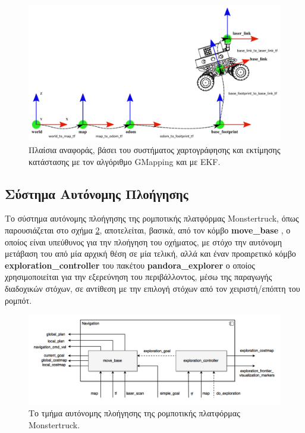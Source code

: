 \begin{figure}[!ht]
	\centering
	\includegraphics[width=\linewidth]{Chapters/Chapter4/Figures/slam_2_reference_frames.png}
	\caption{Πλαίσια αναφοράς, βάσει του συστήματος χαρτογράφησης και εκτίμησης κατάστασης με τον αλγόριθμο GMapping και με EKF.}
	\label{fig:slam_2_reference_frames}
\end{figure}

\subsection{Σύστημα Αυτόνομης Πλοήγησης}
Το σύστημα αυτόνομης πλοήγησης της ρομποτικής πλατφόρμας Monstertruck, όπως παρουσιάζεται στο σχήμα \ref{fig:navigation_component_diagram}, αποτελείται, βασικά, από τον κόμβο \textbf{move{\_}base} \cite{move_base}, ο οποίος είναι υπεύθυνος για την πλοήγηση του οχήματος, με στόχο την αυτόνομη μετάβαση του από μία αρχική θέση σε μία τελική, αλλά και έναν προαιρετικό κόμβο \textbf{exploration{\_}controller} του πακέτου \textbf{pandora{\_}explorer} ο οποίος χρησιμοποιείται για την εξερεύνηση του περιβάλλοντος, μέσω της παραγωγής διαδοχικών στόχων, σε αντίθεση με την επιλογή στόχων από τον χειριστή/επόπτη του ρομπότ.

\begin{figure}[!ht]
	\centering
	\includegraphics[width=\linewidth]{Chapters/Chapter4/Figures/navigation_component_diagram.png}
	\caption{Το τμήμα αυτόνομης πλοήγησης της ρομποτικής πλατφόρμας Monstertruck.}
	\label{fig:navigation_component_diagram}
\end{figure}

